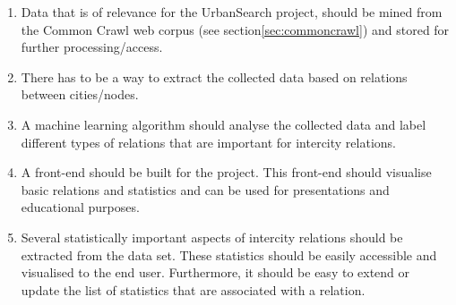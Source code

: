 \begin{enumerate}
    \item Data that is of relevance for the UrbanSearch project, should be mined from the Common Crawl web corpus (see section\ref{sec:commoncrawl}) and stored for further processing/access.
    \item There has to be a way to extract the collected data based on relations between cities/nodes.
    \item A machine learning algorithm should analyse the collected data and label different types of relations that are important for intercity relations.
    \item A front-end should be built for the project. This front-end should visualise basic relations and statistics and can be used for presentations and educational purposes.
    \item Several statistically important aspects of intercity relations should be extracted from the data set. These statistics should be easily accessible and visualised to the end user. Furthermore, it should be easy to extend or update the list of statistics that are associated with a relation.
\end{enumerate}

